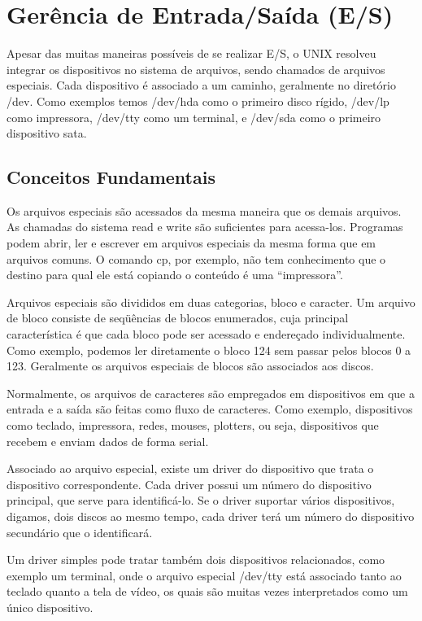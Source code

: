 \chapter{Gerência de Entrada/Saída (E/S)}

Apesar das muitas maneiras possíveis de se realizar E/S, o UNIX resolveu integrar os dispositivos no sistema de arquivos, sendo chamados de arquivos especiais. Cada dispositivo é associado a um caminho, geralmente no diretório /dev. Como exemplos temos /dev/hda como o primeiro disco rígido, /dev/lp como impressora, /dev/tty como um terminal, e /dev/sda como o primeiro dispositivo sata.

\section{Conceitos Fundamentais}

Os arquivos especiais são acessados da mesma maneira que os demais arquivos. As chamadas do sistema read e write são suficientes para acessa-los. Programas podem abrir, ler e escrever em arquivos especiais da mesma forma que em arquivos comuns. O comando cp, por exemplo, não tem conhecimento que o destino para qual ele está copiando o conteúdo é uma “impressora”.

Arquivos especiais são divididos em duas categorias, bloco e caracter. Um arquivo de bloco consiste de seqüências de blocos enumerados, cuja principal característica é que cada bloco pode ser acessado e endereçado individualmente. Como exemplo, podemos ler diretamente o bloco 124 sem passar pelos blocos 0 a 123. Geralmente os arquivos especiais de blocos são associados aos discos.

Normalmente, os arquivos de caracteres são empregados em dispositivos em que a entrada e a saída são feitas como fluxo de caracteres. Como exemplo, dispositivos como teclado, impressora, redes, mouses, plotters, ou seja, dispositivos que recebem e enviam dados de forma serial.

Associado ao arquivo especial, existe um driver do dispositivo que trata o dispositivo correspondente. Cada driver possui um número do dispositivo principal, que serve para identificá-lo. Se o driver suportar vários dispositivos, digamos, dois discos ao mesmo tempo, cada driver terá um número do dispositivo secundário que o identificará.

Um driver simples pode tratar também dois dispositivos relacionados, como exemplo um terminal, onde o arquivo especial /dev/tty está associado tanto ao teclado quanto a tela de vídeo, os quais são muitas vezes interpretados como um único dispositivo.

